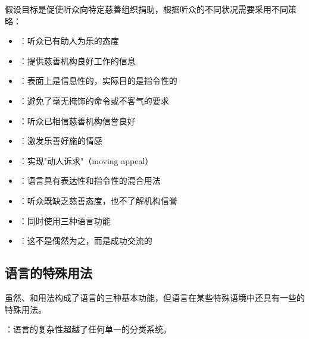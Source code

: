 \begin{examplebox}[title=慈善捐助的说服策略]
假设目标是促使听众向特定慈善组织捐助，根据听众的不同状况需要采用不同策略：

\begin{itemize}
  \item {}：听众已有助人为乐的态度
  \item {}：提供慈善机构良好工作的信息
  \item {}：表面上是信息性的，实际目的是指令性的
  \item {}：避免了毫无掩饰的命令或不客气的要求
\end{itemize}

\begin{itemize}
  \item {}：听众已相信慈善机构信誉良好
  \item {}：激发乐善好施的情感
  \item {}：实现"动人诉求"（moving appeal）
  \item {}：语言具有表达性和指令性的混合用法
\end{itemize}

\begin{itemize}
  \item {}：听众既缺乏慈善态度，也不了解机构信誉
  \item {}：同时使用三种语言功能
  \item {}：这不是偶然为之，而是成功交流的
\end{itemize}
\end{examplebox}

\subsection{语言的特殊用法}

\begin{theorembox}[title=三重划分的局限性]
虽然、和用法构成了语言的三种基本功能，但语言在某些特殊语境中还具有一些的特殊用法。

：语言的复杂性超越了任何单一的分类系统。
\end{theorembox}

